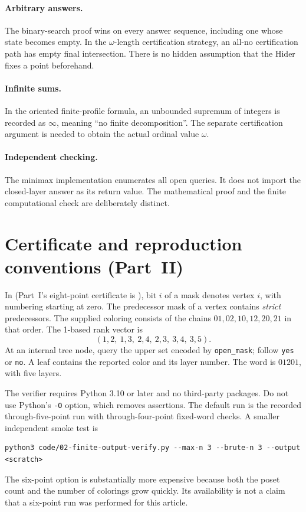 \documentclass[11pt,letterpaper]{article}
\numberwithin{equation}{section}
\theoremstyle{definition}
\theoremstyle{remark}
\theoremstyle{definition}
\begin{document}
\paragraph{Arbitrary answers.}
The binary-search proof wins on every answer sequence, including one whose
state becomes empty. In the $\omega$-length certification strategy, an
all-no certification path has empty final intersection. There is no hidden
assumption that the Hider fixes a point beforehand.

\paragraph{Infinite sums.}
In the oriented finite-profile formula, an unbounded supremum of integers is
recorded as $\infty$, meaning ``no finite decomposition''. The separate
certification argument is needed to obtain the actual ordinal value $\omega$.

\paragraph{Independent checking.}
The minimax implementation enumerates all open queries. It does not import the
closed-layer answer as its return value. The mathematical proof and the
finite computational check are deliberately distinct.

\section{Certificate and reproduction conventions (Part~II)}
\label{fo:app:certificates}

In  (Part~I's
eight-point certificate is ), bit $i$ of
a mask denotes vertex $i$,
with numbering starting at zero. The predecessor mask of a vertex contains
\emph{strict} predecessors. The supplied coloring consists of the chains
$01,02,10,12,20,21$ in that order. The 1-based rank vector is
\[
 (1,2,\ 1,3,\ 2,4,\ 2,3,\ 3,4,\ 3,5).
\]
At an internal tree node, query the upper set encoded by
\texttt{open\_mask}; follow \texttt{yes} or \texttt{no}. A leaf contains the
reported color and its layer number. The word is $01201$, with five layers.

The verifier requires Python 3.10 or later and no third-party packages.
Do not use Python's \texttt{-O} option, which removes assertions. The default
run is the recorded through-five-point run with through-four-point fixed-word
checks. A smaller independent smoke test is
\begin{lstlisting}
python3 code/02-finite-output-verify.py --max-n 3 --brute-n 3 --output <scratch>
\end{lstlisting}
The six-point option is substantially more expensive because both the poset
count and the number of colorings grow quickly. Its availability is not a
claim that a six-point run was performed for this article.
\end{document}
